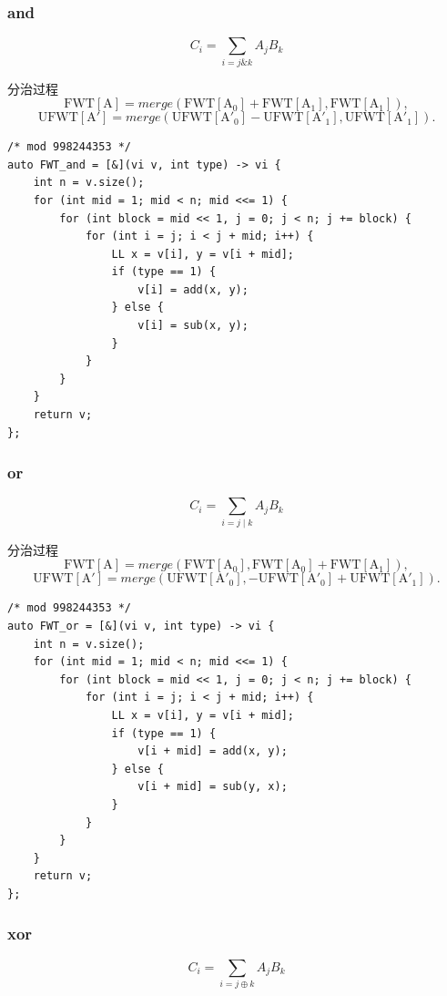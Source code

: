 \documentclass[UTF8, a4paper, titlepage, twoside]{ctexart}
\begin{document}
\subsubsection*{ and }
\[
C_i = \sum\limits_{i = j \& k} A_j B_k
\]

分治过程
\[
\operatorname{FWT[A]} = merge(\operatorname{FWT[A_0]} + \operatorname{FWT[A_1]}, \operatorname{FWT[A_1]}),
\]
\[
\operatorname{UFWT[A']} = merge(\operatorname{UFWT[A'_0]} - \operatorname{UFWT[A'_1]}, \operatorname{UFWT[A'_1]}).
\]

\begin{lstlisting}[style=cpp]
/* mod 998244353 */
auto FWT_and = [&](vi v, int type) -> vi {
    int n = v.size();
    for (int mid = 1; mid < n; mid <<= 1) {
        for (int block = mid << 1, j = 0; j < n; j += block) {
            for (int i = j; i < j + mid; i++) {
                LL x = v[i], y = v[i + mid];
                if (type == 1) {
                    v[i] = add(x, y);
                } else {
                    v[i] = sub(x, y);
                }
            }
        }
    }
    return v;
};
\end{lstlisting}

\subsubsection*{ or }
\[
C_i = \sum\limits_{i = j \mid k} A_j B_k
\]

分治过程
\[
\operatorname{FWT[A]} = merge(\operatorname{FWT[A_0]}, \operatorname{FWT[A_0]} + \operatorname{FWT[A_1]}),
\]
\[
\operatorname{UFWT[A']} = merge(\operatorname{UFWT[A'_0]}, -\operatorname{UFWT[A'_0]} + \operatorname{UFWT[A'_1]}).
\]

\begin{lstlisting}[style=cpp]
/* mod 998244353 */
auto FWT_or = [&](vi v, int type) -> vi {
    int n = v.size();
    for (int mid = 1; mid < n; mid <<= 1) {
        for (int block = mid << 1, j = 0; j < n; j += block) {
            for (int i = j; i < j + mid; i++) {
                LL x = v[i], y = v[i + mid];
                if (type == 1) {
                    v[i + mid] = add(x, y);
                } else {
                    v[i + mid] = sub(y, x);
                }
            }
        }
    }
    return v;
};
\end{lstlisting}

\subsubsection*{ xor }
\[
C_i = \sum\limits_{i = j \oplus k} A_j B_k
\]
\end{document}
